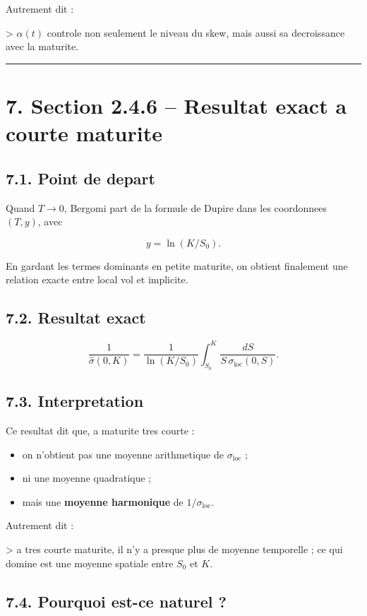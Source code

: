 \documentclass[11pt,a4paper]{article}
\begin{document}
Autrement dit :

> \(\alpha(t)\) controle non seulement le niveau du skew, mais aussi sa decroissance avec la maturite.

\bigskip\hrule\bigskip

\section{7. Section 2.4.6 -- Resultat exact a courte maturite}

\subsection{7.1. Point de depart}

Quand \(T\to 0\), Bergomi part de la formule de Dupire dans les coordonnees \((T,y)\), avec

\[
y=\ln(K/S_0).
\]

En gardant les termes dominants en petite maturite, on obtient finalement une relation exacte entre local vol et implicite.

\subsection{7.2. Resultat exact}

\[
\boxed{
\frac{1}{\widehat{\sigma}(0,K)}
=
\frac{1}{\ln(K/S_0)}
\int_{S_0}^{K}\frac{dS}{S\,\sigma_{\mathrm{loc}}(0,S)}.
}
\]

\subsection{7.3. Interpretation}

Ce resultat dit que, a maturite tres courte :

\begin{itemize}
\item on n'obtient pas une moyenne arithmetique de \(\sigma_{\mathrm{loc}}\) ;
\item ni une moyenne quadratique ;
\item mais une \textbf{moyenne harmonique} de \(1/\sigma_{\mathrm{loc}}\).
\end{itemize}

Autrement dit :

> a tres courte maturite, il n'y a presque plus de moyenne temporelle ; ce qui domine est une moyenne spatiale entre \(S_0\) et \(K\).

\subsection{7.4. Pourquoi est-ce naturel ?}
\end{document}
